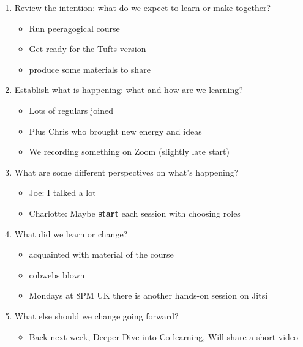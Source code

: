 \begin{enumerate}
\def\labelenumi{\arabic{enumi}.}
\tightlist
\item
  Review the intention: what do we expect to learn or make together?

  \begin{itemize}
  \tightlist
  \item
    Run peeragogical course
  \item
    Get ready for the Tufts version
  \item
    produce some materials to share
  \end{itemize}
\item
  Establish what is happening: what and how are we learning?

  \begin{itemize}
  \tightlist
  \item
    Lots of regulars joined
  \item
    Plus Chris who brought new energy and ideas
  \item
    We recording something on Zoom (slightly late start)
  \end{itemize}
\item
  What are some different perspectives on what's happening?

  \begin{itemize}
  \tightlist
  \item
    Joe: I talked a lot
  \item
    Charlotte: Maybe \textbf{start} each session with choosing roles
  \end{itemize}
\item
  What did we learn or change?

  \begin{itemize}
  \tightlist
  \item
    acquainted with material of the course
  \item
    cobwebs blown
  \item
    Mondays at 8PM UK there is another hands-on session on Jitsi
  \end{itemize}
\item
  What else should we change going forward?

  \begin{itemize}
  \tightlist
  \item
    Back next week, Deeper Dive into Co-learning, Will share a short
    video
  \end{itemize}
\end{enumerate}

